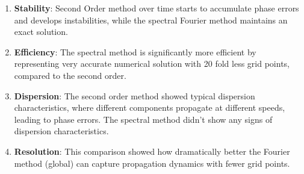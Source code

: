 \begin{enumerate}
	\item \textbf{Stability}: Second Order method over time starts to accumulate phase errors and develops instabilities, while the spectral Fourier method maintains an exact solution.
	\item \textbf{Efficiency}: The spectral method is significantly more efficient by representing very accurate numerical solution with 20 fold less grid points, compared to the second order.
	\item \textbf{Dispersion}: The second order method showed typical dispersion characteristics, where different components propagate at different speeds, leading to phase errors. The spectral method didn't show any signs of dispersion characteristics.
	\item \textbf{Resolution}: This comparison showed how dramatically better the Fourier method (global) can capture propagation dynamics with fewer grid points.
\end{enumerate}
